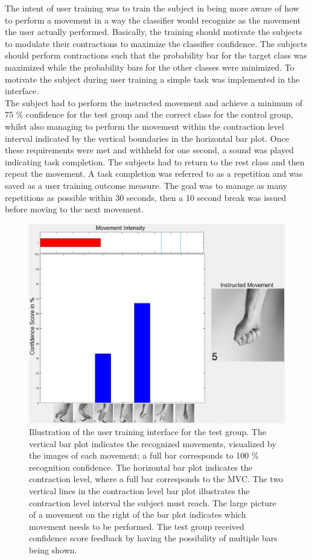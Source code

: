 The intent of user training was to train the subject in being more aware of how to perform a movement in a way the classifier would recognize as the movement the user actually performed. Basically, the training should motivate the subjects to modulate their contractions to maximize the classifier confidence. The subjects should perform contractions such that the probability bar for the target class was maximized while the probability bars for the other classes were minimized. To motivate the subject during user training a simple task was implemented in the interface. \\
The subject had to perform the instructed movement and achieve a minimum of 75 \% confidence for the test group and the correct class for the control group, whilst also managing to perform the movement within the contraction level interval indicated by the vertical boundaries in the horizontal bar plot. Once these requirements were met and withheld for one second, a sound was played indicating task completion. The subjects had to return to the rest class and then repeat the movement. A task completion was referred to as a repetition and was saved as a user training outcome measure. The goal was to manage as many repetitions as possible within 30 seconds, then a 10 second break was issued before moving to the next movement.
\vspace{-0.2cm}
\begin{figure}[H]
	\includegraphics[width=.47\textwidth]{figures/xBackground/usertraintestGUI}
	\caption{Illustration of the user training interface for the test group. The vertical bar plot indicates the recognized movements, visualized by the images of each movement; a full bar corresponds to 100 \% recognition confidence. The horizontal bar plot indicates the contraction level, where a full bar corresponds to the MVC. The two vertical lines in the contraction level bar plot illustrates the contraction level interval the subject must reach. The large picture of a movement on the right of the bar plot indicates which movement needs to be performed. The test group received confidence score feedback by having the possibility of multiple bars being shown.}
	\label{fig:test}
\end{figure}
